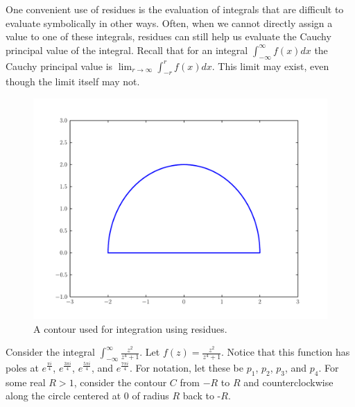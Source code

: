 One convenient use of residues is the evaluation of integrals that are difficult to evaluate symbolically in other ways.
Often, when we cannot directly assign a value to one of these integrals, residues can still help us evaluate the Cauchy principal value of the integral.
Recall that for an integral $\int_{-\infty}^{\infty} f(x)dx$ the Cauchy principal value is $\lim_{r\to \infty} \int_{-r}^{r} f(x) dx$. This limit may exist, even though the limit itself may not.

\begin{figure}
\includegraphics[width=\textwidth]{contour1.pdf}
\caption{A contour used for integration using residues.}
\label{complexint:c1}
\end{figure}

Consider the integral $\int_{-\infty}^{\infty}\frac{z^2}{z^4+1}$. Let $f(z)=\frac{z^2}{z^4+1}$.
Notice that this function has poles at $e^{\frac{\pi i}{4}}$, $e^{\frac{3\pi i}{4}}$, $e^{\frac{5\pi i}{4}}$, and $e^{\frac{7\pi i}{4}}$.
For notation, let these be $p_1$, $p_2$, $p_3$, and $p_4$.
For some real $R>1$, consider the contour $C$ from $-R$ to $R$ and counterclockwise along the circle centered at $0$ of radius $R$ back to -$R$.

